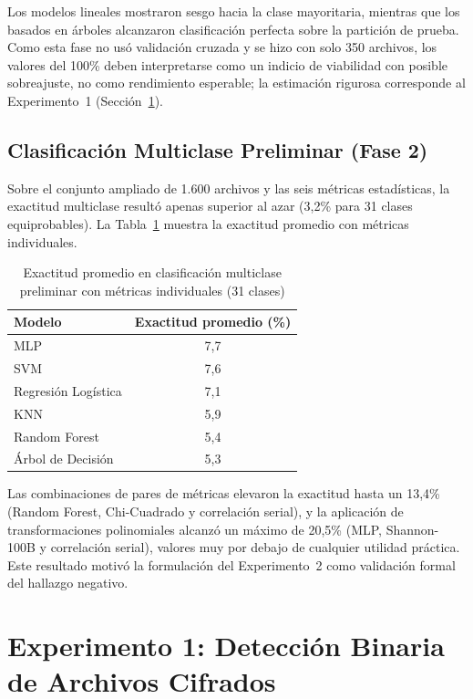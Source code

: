 Los modelos lineales mostraron sesgo hacia la clase mayoritaria, mientras que los basados en árboles alcanzaron clasificación perfecta sobre la partición de prueba. Como esta fase no usó validación cruzada y se hizo con solo 350 archivos, los valores del 100\% deben interpretarse como un indicio de viabilidad con posible sobreajuste, no como rendimiento esperable; la estimación rigurosa corresponde al Experimento~1 (Sección~\ref{sec:exp1}).

\subsection{Clasificación Multiclase Preliminar (Fase 2)}

Sobre el conjunto ampliado de 1.600 archivos y las seis métricas estadísticas, la exactitud multiclase resultó apenas superior al azar (3,2\% para 31 clases equiprobables). La Tabla~\ref{tab:res_prelim_multi} muestra la exactitud promedio con métricas individuales.

\begin{table}[ht]
\centering
\caption{Exactitud promedio en clasificación multiclase preliminar con métricas individuales (31 clases)}
\label{tab:res_prelim_multi}
\begin{tabular}{|l|c|}
\hline
\textbf{Modelo} & \textbf{Exactitud promedio (\%)} \\
\hline
MLP & 7,7 \\
SVM & 7,6 \\
Regresión Logística & 7,1 \\
KNN & 5,9 \\
Random Forest & 5,4 \\
Árbol de Decisión & 5,3 \\
\hline
\end{tabular}
\end{table}

Las combinaciones de pares de métricas elevaron la exactitud hasta un 13,4\% (Random Forest, Chi-Cuadrado y correlación serial), y la aplicación de transformaciones polinomiales alcanzó un máximo de 20,5\% (MLP, Shannon-100B y correlación serial), valores muy por debajo de cualquier utilidad práctica. Este resultado motivó la formulación del Experimento~2 como validación formal del hallazgo negativo.

\section{Experimento 1: Detección Binaria de Archivos Cifrados}
\label{sec:exp1}

